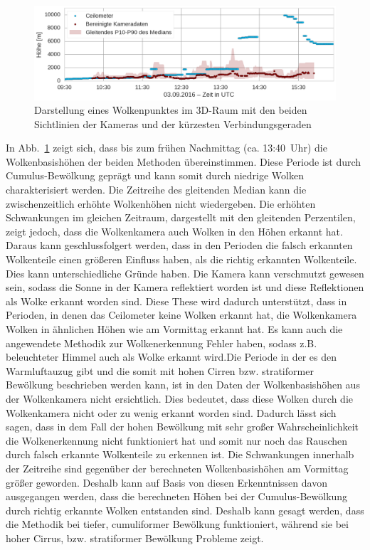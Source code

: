 \documentclass[a4paper,11pt,twoside,german]{article}
\newcommand{\absatz}{\smallbreak}
\begin{document}
\begin{figure}[h]
	\begin{center}
		\includegraphics[width=1\textwidth]{media/ceilo_cam_new.png}
		\caption[Zeitreihenvergleich Wolkenkameras mit Ceilometer]{Darstellung eines Wolkenpunktes im 3D-Raum mit den beiden Sichtlinien der Kameras und der kürzesten Verbindungsgeraden}
		\label{FIGCeilo}
	\end{center}
\end{figure}

In Abb.~\ref{FIGCeilo} zeigt sich, dass bis zum frühen Nachmittag (ca.
13:40~Uhr) die Wolkenbasishöhen der beiden Methoden übereinstimmen. Diese
Periode ist durch Cumulus-Bewölkung geprägt und kann somit durch niedrige Wolken
charakterisiert werden. Die Zeitreihe des gleitenden Median kann die
zwischenzeitlich erhöhte Wolkenhöhen nicht wiedergeben. Die erhöhten
Schwankungen im gleichen Zeitraum, dargestellt mit den gleitenden Perzentilen,
zeigt jedoch, dass die Wolkenkamera auch Wolken in den Höhen erkannt hat. Daraus
kann geschlussfolgert werden, dass in den Perioden die falsch erkannten
Wolkenteile einen größeren Einfluss haben, als die richtig erkannten
Wolkenteile. Dies kann unterschiedliche Gründe haben. Die Kamera kann
verschmutzt gewesen sein, sodass die Sonne in der Kamera reflektiert worden ist
und diese Reflektionen als Wolke erkannt worden sind. Diese These wird dadurch
unterstützt, dass in Perioden, in denen das Ceilometer keine Wolken erkannt hat,
die Wolkenkamera Wolken in ähnlichen Höhen wie am Vormittag erkannt hat. Es kann
auch die angewendete Methodik zur Wolkenerkennung Fehler haben, sodass z.B.
beleuchteter Himmel auch als Wolke erkannt wird.\absatz Die Periode in der es
den Warmluftauzug gibt und die somit mit hohen Cirren bzw. stratiformer
Bewölkung beschrieben werden kann, ist in den Daten der Wolkenbasishöhen aus der
Wolkenkamera nicht ersichtlich. Dies bedeutet, dass diese Wolken durch die
Wolkenkamera nicht oder zu wenig erkannt worden sind. Dadurch lässt sich sagen,
dass in dem Fall der hohen Bewölkung mit sehr großer Wahrscheinlichkeit die
Wolkenerkennung nicht funktioniert hat und somit nur noch das Rauschen durch
falsch erkannte Wolkenteile zu erkennen ist. Die Schwankungen innerhalb der
Zeitreihe sind gegenüber der berechneten Wolkenbasishöhen am Vormittag größer
geworden. Deshalb kann auf Basis von diesen Erkenntnissen davon ausgegangen
werden, dass die berechneten Höhen bei der Cumulus-Bewölkung durch richtig
erkannte Wolken entstanden sind. Deshalb kann gesagt werden, dass die Methodik
bei tiefer, cumuliformer Bewölkung funktioniert, während sie bei hoher Cirrus,
bzw. stratiformer Bewölkung Probleme zeigt.  
\end{document}
